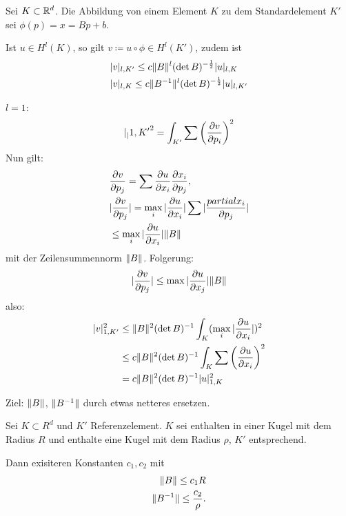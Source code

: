 Sei $K \subset \mathbb{R}^d$. Die Abbildung von einem Element $K$ zu dem Standardelement $K'$ sei $\phi(p) = x = Bp + b$. 
\begin{lemma}
  Ist $u \in H^l(K)$, so gilt $v \coloneqq u \circ \phi \in H^l(K')$, zudem ist
  \begin{align*}
    &|v|_{l, K'}\leq c \|B\|^l(\det B)^{- \frac 1 2} |u|_{l, K}\\
   & |v|_{l, K} \leq c \|B^{-1}\|^l(\det B)^{- \frac 1 2} |u|_{l, K'}
  \end{align*}
\end{lemma}
\begin{beweisidee}
  $l = 1$:
  \begin{align*}
    |_|{1,K'}^2 = \int_{K'} \sum\left(\frac{\partial v}{\partial p_i}\right)^2
  \end{align*}
Nun gilt:
\begin{align*}
&  \frac{\partial v}{\partial p_j} = \sum \frac {\partial u}{\partial x_i} \frac{\partial x_i} {\partial p_j},  \\
&  |\frac{\partial v}{\partial p_j}| = \max_i |\frac{\partial u}{\partial x_i}| \sum|\frac{partial x_i}{\partial p_j}| \\
&\leq \max_i |\frac{\partial u}{\partial x_i}| \|B\|
\end{align*}
mit der Zeilensummennorm $\|B\|$. Folgerung:
\begin{align*}
  |\frac{\partial v}{\partial p_j} | \leq \max |\frac{\partial u}{\partial x_j}|\|B\| 
\end{align*}
also: 
\begin{align*}
  |v|_{1, K'}^2 &\leq \|B\|^2 (\det B)^{-1} \int_K (\max_i |\frac{\partial u}{\partial x_i}|)^2\\
&\leq c\|B\|^2 (\det B)^{-1} \int_K \sum \left(\frac{\partial u}{\partial x_i}\right)^2\\
&= c\|B\|^2 (\det B)^{-1} |u|_{1, K}^2
\end{align*}
\end{beweisidee}
Ziel: $\|B\|$, $\|B^{-1}\|$ durch etwas netteres ersetzen.
\begin{lemma}
  Sei $K \subset R^d$ und $K'$ Referenzelement. $K$ sei enthalten in einer Kugel mit dem Radius $R$ und enthalte eine Kugel mit dem Radius $\rho$, $K'$ entsprechend. 

Dann exisiteren Konstanten $c_1, c_2$ mit
\begin{align*}
  \|B\| \leq c_1 R\\
\|B^{-1}\| \leq \frac {c_2} \rho.
\end{align*}
\end{lemma}
